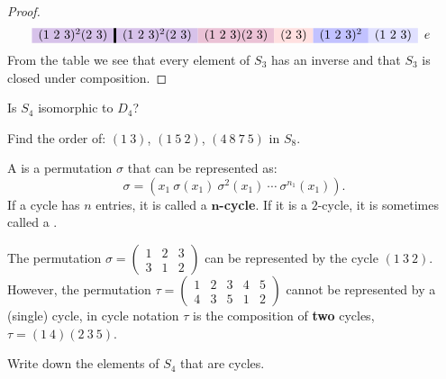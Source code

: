 \documentclass{ximera}
\begin{document}
\begin{example}
\begin{proof}
\begin{gather*}
\begin{array}{c!{\vline width 2pt}cccccc}
        (1\ 2\ 3)^2 (2\ 3)\cellcolor{blue!66!red!24!white}      & (1\ 2\ 3)^2 (2\ 3)\cellcolor{blue!66!red!24!white} & (1\ 2\ 3)(2\ 3) \cellcolor{blue!33!red!24!white}    & (2\ 3) \cellcolor{red!12!white}   & (1\ 2\ 3)^2\cellcolor{blue!24!white}    & (1\ 2\ 3)\cellcolor{blue!12!white}   & e     \\  
      \end{array}
    \end{gather*}
    From the table we see that every element of $S_3$ has an inverse
    and that $S_3$ is closed under composition.
  \end{proof}
\end{example}

\begin{exercise}
  Is $S_4$ isomorphic to $D_4$?
\end{exercise}


\begin{exercise}
  Find the order of: $(1 \ 3)$, $(1 \ 5 \ 2)$, $(4 \ 8 \ 7 \ 5)$ in
  $S_8$.
\end{exercise}



\begin{definition}
  A  is a permutation $\sigma$ that can be represented as:
  \[
  \sigma = (x_1\ \sigma(x_1)\ \sigma^2(x_1)\ \cdots\ \sigma^{n_1}(x_1)) .
  \]
  If a cycle has $n$ entries, it is called a
  $\boldsymbol{n}$\textbf{-cycle}. If it is a $2$-cycle, it is
  sometimes called a .
\end{definition}


\begin{example}
  The permutation $\sigma = \left(\begin{smallmatrix}
    1 & 2 & 3\\
    3 & 1 & 2
  \end{smallmatrix}\right)$ can be represented by the cycle $(1\ 3 \ 2)$. However,
  the permutation $\tau = \left(\begin{smallmatrix}
    1 & 2 & 3 & 4 & 5\\
    4 & 3 & 5 & 1 & 2
  \end{smallmatrix}\right)$ cannot be represented by a (single) cycle, in cycle notation $\tau$ is the composition of \textbf{two} cycles, $\tau = (1\ 4)(2\ 3\ 5)$.
\end{example}




\begin{exercise}
  Write down the elements of $S_4$ that are cycles. 
\end{exercise}
\end{document}
